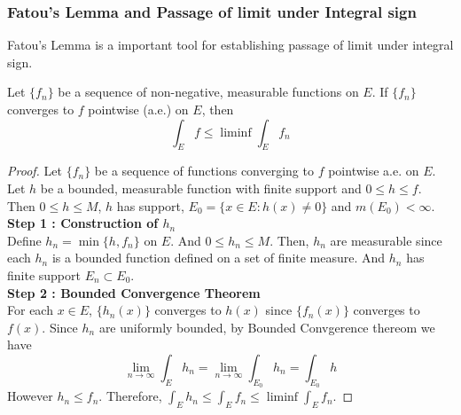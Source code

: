 \subsubsection{Fatou's Lemma and Passage of limit under Integral sign}
	Fatou's Lemma is a important tool for establishing passage of limit under integral sign.
\begin{lemma}[Fatou]
	Let $\{ f_n \}$ be a sequence of non-negative, measurable functions on $E$.
	If $\{ f_n \}$ converges to $f$ pointwise (a.e.) on $E$, then 
	\[ \int_E f \le \liminf \int_E f_n \]
\end{lemma}
\begin{proof}
	Let $\{ f_n \}$ be a sequence of functions converging to $f$ pointwise a.e. on $E$.
	Let $h$ be a bounded, measurable function with finite support and $0 \le h \le f$.
	Then $0 \le h \le M$, $h$ has support, $E_0 = \{ x \in E : h(x) \ne 0 \}$ and $m(E_0) < \infty$.\\

	\textbf{Step 1 : Construction of $h_n$}\\
	Define $h_n = \min \{ h,f_n \}$ on $E$.
	And $0 \le h_n \le M$.
	Then, $h_n$ are measurable since each $h_n$ is a bounded function defined on a set of finite measure.
	And $h_n$ has finite support $E_n \subset E_0$.\\

	\textbf{Step 2 : Bounded Convergence Theorem}\\
	For each $x \in E$, $\{ h_n(x) \}$ converges to $h(x)$ since $\{ f_n(x) \}$ converges to $f(x)$.
	Since $h_n$ are uniformly bounded, by Bounded Convgerence thereom we have
	\[ \lim_{n \to \infty} \int_E h_n = \lim_{n \to \infty} \int_{E_0} h_n = \int_{E_0} h \]
	However $h_n \le f_n$.
	Therefore, $\displaystyle \int_E h_n \le \int_E f_n \le \liminf \int_E f_n$.
\end{proof}

